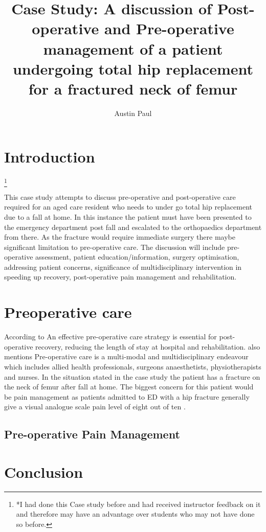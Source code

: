 \documentclass[a4paper,man,british]{apa6}
\title{Case Study: A discussion of Post-operative and Pre-operative management of a patient undergoing total hip replacement for a fractured neck of femur}
\author{Austin Paul}
\affiliation{RMIT UNIVERSITY \\ s3634517 \\ Word Count : 000}
\newcommand\blfootnote[1]{%
  \begingroup
  \renewcommand\thefootnote{}\footnote{#1}%
  \addtocounter{footnote}{-1}%
  \endgroup
}
\begin{document}
\maketitle

\section{}
\section{Introduction} %
%
\blfootnote{*I had done this Case study before and had received instructor feedback on it and therefore may have an advantage over students who may not have done so before.}
This case study attempts to discuss pre-operative and post-operative care required for an aged care resident who needs to under go total hip replacement due to a fall at home. In this instance the patient must have been presented to the emergency department post fall and escalated to the orthopaedics department from there. As the fracture would require immediate surgery there maybe significant limitation to pre-operative care. The discussion will include pre-operative assessment, patient education/information, surgery optimisation, addressing patient concerns, significance of multidisciplinary intervention in speeding up recovery, post-operative pain management and rehabilitation.




\section{Preoperative care} %

According to \textcite{molko_rapid_2017} An effective pre-operative care strategy is essential for post-operative recovery, reducing the length of stay at hospital and rehabilitation. \citeauthor{molko_rapid_2017} also mentions Pre-operative care is a multi-modal and multidisciplinary endeavour which includes allied health professionals, surgeons anaesthetists, physiotherapists and nurses. In the situation stated in the case study the patient has a fracture on the neck of femur after fall at home. The biggest concern for this patient would be pain management as patients admitted to ED with a hip fracture generally give a visual analogue scale pain level of eight out of ten \parencite{monzon_pain_2010}.

\subsection{Pre-operative Pain Management}





\section{} %




\newpage
\section{Conclusion}%



\end{document}
